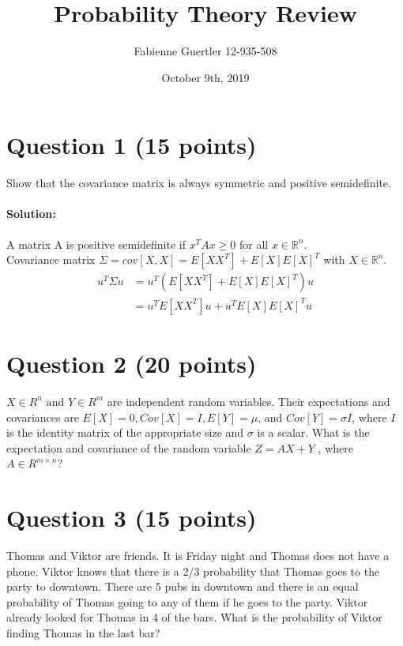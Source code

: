 \documentclass[
	10pt, %
]{../fphw}
\title{Probability Theory Review} %
\author{Fabienne Guertler 12-935-508} %
\date{October 9th, 2019} %
\institute{University of Bern} %
\begin{document}
	\maketitle
	\section*{Question 1 (15 points)}
	\begin{problem}
		Show that the covariance matrix is always symmetric and positive semidefinite.
	\end{problem}
	\paragraph{Solution:} A matrix A is positive semidefinite if $x^TAx \ge 0$ for all $x\in\mathbb{R}^n$.\\
	Covariance matrix $\Sigma = cov[X,X] = E[XX^T] + E[X]E[X]^T$ with $X\in\mathbb{R}^n$.
	\begin{align*}
		u^T\Sigma u &= u^T(E[XX^T]+E[X]E[X]^T)u\\
		&= u^TE[XX^T]u + u^TE[X]E[X]^Tu
	\end{align*}
	
	\section*{Question 2 (20 points)}
	\begin{problem}
		$X\in R^n\text{ and }Y\in R^m$ are independent random variables. Their expectations and covariances are $E[X] = 0, Cov[X] = I, E[Y] = \mu\text{, and } Cov[Y]=\sigma I$, where $I$ is the identity matrix of the appropriate size and $\sigma$ is a scalar. What is the expectation and covariance of the random variable $Z = AX + Y$ , where $A\in R^{m\times n}$?
	\end{problem}

	\section*{Question 3 (15 points)}
	\begin{problem}
		Thomas and Viktor are friends. It is Friday night and Thomas does not have a phone. Viktor knows that there is a 2/3 probability
		that Thomas goes to the party to downtown. There are 5 pubs in downtown and there is an equal probability of Thomas going to
		any of them if he goes to the party. Viktor already looked for Thomas in 4 of the bars.
		What is the probability of Viktor finding Thomas in the last bar?
	\end{problem}
\end{document}
